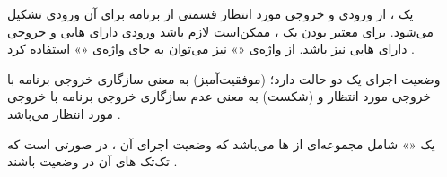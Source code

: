 
یک ، از ورودی و خروجی مورد انتظار قسمتی از برنامه برای
آن ورودی تشکیل می‌شود. برای معتبر بودن یک ، ممکن‌است لازم
باشد ورودی دارای ‌هایی و خروجی دارای
‌هایی نیز باشد. از واژه‌ی «» نیز می‌توان به
جای واژه‌ی «» استفاده کرد .

وضعیت اجرای یک  دو حالت دارد؛  (موفقیت‌آمیز) به
معنی سازگاری خروجی برنامه با خروجی مورد انتظار و  (شکست) به
معنی عدم سازگاری خروجی برنامه با خروجی مورد انتظار می‌باشد
.

یک «» شامل مجموعه‌ای از ‌ها می‌باشد که وضعیت
اجرای آن ، در صورتی  است که تک‌تک
‌های آن در وضعیت  باشند .


